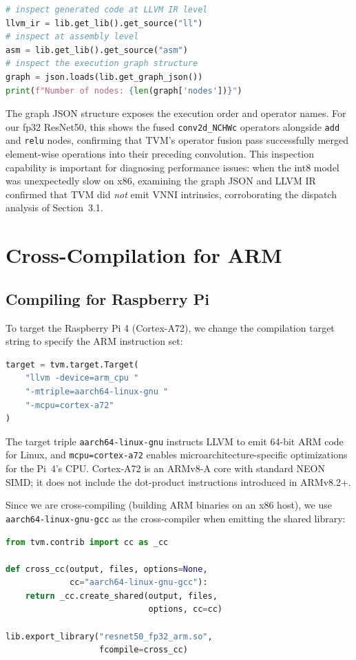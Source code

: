 \documentclass[11pt,a4paper]{article}
\begin{document}
\begin{lstlisting}[language=Python]
# inspect generated code at LLVM IR level
llvm_ir = lib.get_lib().get_source("ll")
# inspect at assembly level
asm = lib.get_lib().get_source("asm")
# inspect the execution graph structure
graph = json.loads(lib.get_graph_json())
print(f"Number of nodes: {len(graph['nodes'])}")
\end{lstlisting}

The graph JSON structure exposes the execution order and operator names. For our fp32 ResNet50, this shows the fused \texttt{conv2d\_NCHWc} operators alongside \texttt{add} and \texttt{relu} nodes, confirming that TVM's operator fusion pass successfully merged element-wise operations into their preceding convolution. This inspection capability is important for diagnosing performance issues: when the int8 model was unexpectedly slow on x86, examining the graph JSON and LLVM IR confirmed that TVM did \emph{not} emit VNNI intrinsics, corroborating the dispatch analysis of Section~3.1.


\section{Cross-Compilation for ARM}

\subsection{Compiling for Raspberry Pi}

To target the Raspberry Pi 4 (Cortex-A72), we change the compilation target string to specify the ARM instruction set:

\begin{lstlisting}[language=Python]
target = tvm.target.Target(
    "llvm -device=arm_cpu "
    "-mtriple=aarch64-linux-gnu "
    "-mcpu=cortex-a72"
)
\end{lstlisting}

The target triple \texttt{aarch64-linux-gnu} instructs LLVM to emit 64-bit ARM code for Linux, and \texttt{mcpu=\allowbreak cortex-a72} enables microarchitecture-specific optimizations for the Pi~4's CPU. Cortex-A72 is an ARMv8-A core with standard NEON SIMD; it does not include the dot-product instructions introduced in ARMv8.2+.

Since we are cross-compiling (building ARM binaries on an x86 host), we use \texttt{aarch64-linux-gnu-gcc} as the cross-compiler when emitting the shared library:

\begin{lstlisting}[language=Python]
from tvm.contrib import cc as _cc

def cross_cc(output, files, options=None,
             cc="aarch64-linux-gnu-gcc"):
    return _cc.create_shared(output, files,
                             options, cc=cc)

lib.export_library("resnet50_fp32_arm.so",
                   fcompile=cross_cc)
\end{lstlisting}
\end{document}
